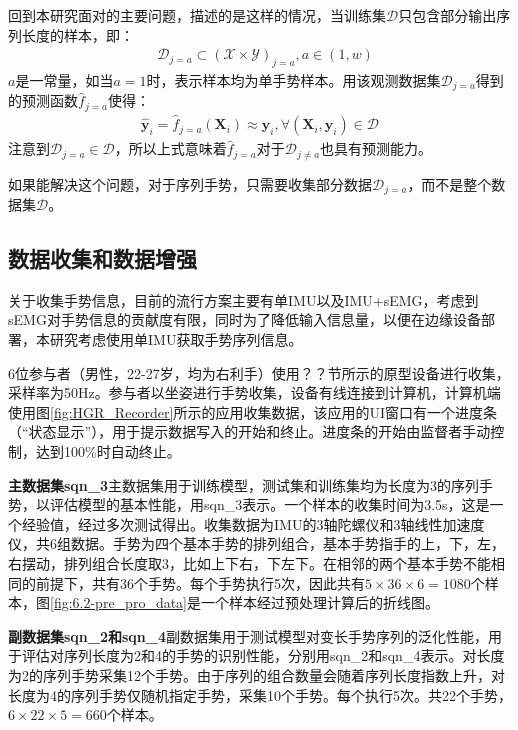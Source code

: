 回到本研究面对的主要问题，描述的是这样的情况，当训练集$\mathcal{D}$只包含部分输出序列长度的样本，即：
\begin{align}
&\mathcal{D}_{j=a} \subset (\mathcal{X} \times \mathcal{Y})_{j=a}, a \in (1, w)
\end{align}
$a$是一常量，如当$a=1$时，表示样本均为单手势样本。用该观测数据集$\mathcal{D}_{j=a}$得到的预测函数$\hat{f}_{j=a}$使得：
\begin{align}
\hat{\mathbf{y}}_i=\hat{f}_{j=a}(\mathbf{X}_i)\approx\mathbf{y}_i, \forall (\mathbf{X}_i, \mathbf{y}_i) \in \mathcal{D}
\end{align}
注意到$\mathcal{D}_{j=a}\in \mathcal{D}$，所以上式意味着$\hat{f}_{j=a}$对于$\mathcal{D}_{j\neq a}$也具有预测能力。

如果能解决这个问题，对于序列手势，只需要收集部分数据$\mathcal{D}_{j=a}$，而不是整个数据集$\mathcal{D}$。

\subsection{数据收集和数据增强}\label{ssec:data_clct}

关于收集手势信息，目前的流行方案主要有单IMU以及IMU+sEMG，考虑到sEMG对手势信息的贡献度有限\cites{li2022research}，同时为了降低输入信息量，以便在边缘设备部署，本研究考虑使用单IMU获取手势序列信息。

6位参与者（男性，22-27岁，均为右利手）使用？？节所示的原型设备进行收集，采样率为50Hz。参与者以坐姿进行手势收集，设备有线连接到计算机，计算机端使用图\ref{fig:HGR_Recorder}所示的应用收集数据，该应用的UI窗口有一个进度条（“状态显示”），用于提示数据写入的开始和终止。进度条的开始由监督者手动控制，达到100\%时自动终止。

\textbf{主数据集sqn\_3}\hspace{5pt}主数据集用于训练模型，测试集和训练集均为长度为3的序列手势，以评估模型的基本性能，用sqn\_3表示。一个样本的收集时间为3.5s，这是一个经验值，经过多次测试得出。收集数据为IMU的3轴陀螺仪和3轴线性加速度仪，共6组数据。手势为四个基本手势的排列组合，基本手势指手的上，下，左，右摆动，排列组合长度取3，比如上下右，下左下。在相邻的两个基本手势不能相同的前提下，共有36个手势。每个手势执行5次，因此共有$5\times 36\times 6 = 1080$个样本，图\ref{fig:6.2-pre_pro_data}是一个样本经过预处理计算后的折线图。

\textbf{副数据集sqn\_2和sqn\_4}\hspace{5pt}副数据集用于测试模型对变长手势序列的泛化性能，用于评估对序列长度为2和4的手势的识别性能，分别用sqn\_2和sqn\_4表示。对长度为2的序列手势采集12个手势。由于序列的组合数量会随着序列长度指数上升，对长度为4的序列手势仅随机指定手势，采集10个手势。每个执行5次。共22个手势，$6\times 22\times 5=660$个样本。

